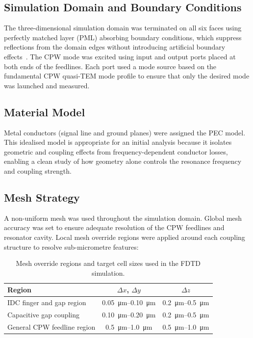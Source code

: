 \documentclass[12pt,a4paper]{article}
\begin{document}
\subsection{Simulation Domain and Boundary Conditions}

The three-dimensional simulation domain was terminated on all six faces
using perfectly matched layer (PML) absorbing boundary conditions, which
suppress reflections from the domain edges without introducing artificial
boundary effects~\cite{Taflove2005}. The CPW mode was excited using
input and output ports placed at both ends of the feedlines. Each port
used a mode source based on the fundamental CPW quasi-TEM mode profile to
ensure that only the desired mode was launched and measured.

\subsection{Material Model}

Metal conductors (signal line and ground planes) were assigned the PEC
model. This idealised model is appropriate for an initial analysis
because it isolates geometric and coupling effects from
frequency-dependent conductor losses, enabling a clean study of how
geometry alone controls the resonance frequency and coupling strength.

\subsection{Mesh Strategy}

A non-uniform mesh was used throughout the simulation domain. Global
mesh accuracy was set to ensure adequate resolution of the CPW feedlines
and resonator cavity. Local mesh override regions were applied around
each coupling structure to resolve sub-micrometre features:

\begin{table}[htbp]
    \centering
    \caption{Mesh override regions and target cell sizes used in the FDTD simulation.}
    \label{tab:mesh}
    \begin{tabular}{lcc}
        \toprule
        Region & $\Delta x$, $\Delta y$ & $\Delta z$ \\
        \midrule
        IDC finger and gap region    & \SIrange{0.05}{0.10}{\micro\metre}
                                     & \SIrange{0.2}{0.5}{\micro\metre} \\
        Capacitive gap coupling      & \SIrange{0.10}{0.20}{\micro\metre}
                                     & \SIrange{0.2}{0.5}{\micro\metre} \\
        General CPW feedline region  & \SIrange{0.5}{1.0}{\micro\metre}
                                     & \SIrange{0.5}{1.0}{\micro\metre} \\
        \bottomrule
    \end{tabular}
\end{table}
\end{document}
